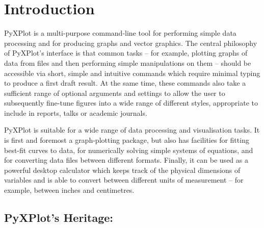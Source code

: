 %
%
%
%
%



\chapter{Introduction}

\label{ch:introduction}

{\sc PyXPlot} is a multi-purpose command-line tool for performing simple data
processing and for producing graphs and vector graphics. The central philosophy
of PyXPlot's interface is that common tasks -- for example, plotting graphs of
data from files and then performing simple manipulations on them -- should be
accessible via short, simple and intuitive commands which require minimal
typing to produce a first draft result.  At the same time, these commands also
take a sufficient range of optional arguments and settings to allow the user to
subsequently fine-tune figures into a wide range of different styles,
appropriate to include in reports, talks or academic journals.

PyXPlot is suitable for a wide range of data processing and visualisation
tasks. It is first and foremost a graph-plotting package, but also has
facilities for fitting best-fit curves to data, for numerically solving simple
systems of equations, and for converting data files between different formats.
Finally, it can be used as a powerful desktop calculator which keeps track of
the physical dimensions of variables and is able to convert between different
units of measurement -- for example, between inches and centimetres.

\section{PyXPlot's Heritage: \gnuplot}


